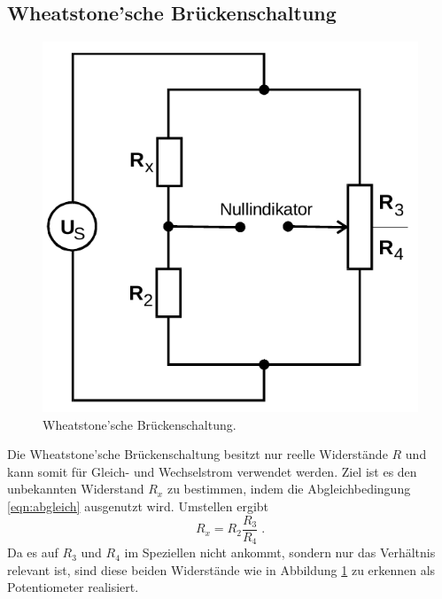 \subsection{Wheatstone'sche Brückenschaltung}
\label{sec:wheatstone}
\begin{figure}[H]
    \centering
    \includegraphics[scale=0.4]{pictures/2-wheatstone.png}
    \caption{Wheatstone'sche Brückenschaltung. \cite{AP01}}
    \label{fig:wheatstone}
\end{figure}
\noindent
Die Wheatstone'sche Brückenschaltung besitzt nur reelle Widerstände $R$ und kann somit für Gleich- und Wechselstrom verwendet werden.
Ziel ist es den unbekannten Widerstand $R_x$ zu bestimmen, indem die Abgleichbedingung \eqref{eqn:abgleich} ausgenutzt wird. Umstellen
ergibt
\begin{equation}
    R_x=R_2\frac{R_3}{R_4} \;.
    \label{eqn:wheatstone}
\end{equation}
Da es auf $R_3$ und $R_4$ im Speziellen nicht ankommt, sondern nur das Verhältnis relevant ist, sind diese beiden Widerstände wie in 
Abbildung \ref{fig:wheatstone} zu erkennen als Potentiometer realisiert. 

